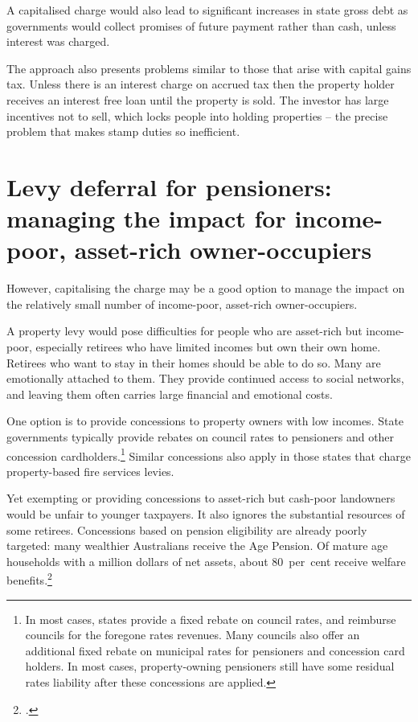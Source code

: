 \documentclass[twoside,english]{palatinob5portrait}
\begin{document}
A capitalised charge would also lead to significant increases in state gross debt as governments would collect promises of future payment rather than cash, unless interest was charged. 

The approach also presents problems similar to those that arise with capital gains tax. Unless there is an interest charge on accrued tax then the property holder receives an interest free loan until the property is sold. The investor has large incentives not to sell, which locks people into holding properties – the precise problem that makes stamp duties so inefficient. 


\section{Levy deferral for pensioners: managing the impact for income-poor, asset-rich owner-occupiers\label{sec:PROP-6-5}}
However, capitalising the charge may be a good option to manage the impact on the relatively small number of income-poor, asset-rich owner-occupiers.

A property levy would pose difficulties for people who are asset-rich but income-poor, especially retirees who have limited incomes but own their own home. Retirees who want to stay in their homes should be able to do so. Many are emotionally attached to them. They provide continued access to social networks, and leaving them often carries large financial and emotional costs. 

One option is to provide concessions to property owners with low incomes. State governments typically provide rebates on council rates to pensioners and other concession cardholders.\footnote{In most cases, states provide a fixed rebate on council rates, and reimburse councils for the foregone rates revenues. Many councils also offer an additional fixed rebate on municipal rates for pensioners and concession card holders. In most cases, property-owning pensioners still have some residual rates liability after these concessions are applied.}  Similar concessions also apply in those states that charge property-based fire services levies. 

Yet exempting or providing concessions to asset-rich but cash-poor landowners would be unfair to younger taxpayers. It also ignores the substantial resources of some retirees. Concessions based on pension eligibility are already poorly targeted: many wealthier Australians receive the Age Pension. Of mature age households with a million dollars of net assets, about 80~per~cent receive welfare benefits.\footcite[][37]{DaleyMcGannonSavageEtAl2013BalancingBudgets}  
\end{document}
